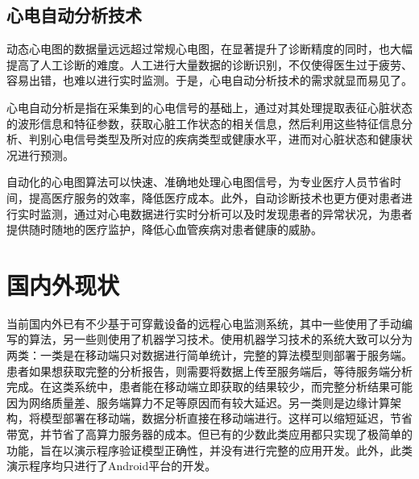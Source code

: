 \subsection{心电自动分析技术}\label{subsec:automatic-analysis}

动态心电图的数据量远远超过常规心电图，在显著提升了诊断精度的同时，也大幅提高了人工诊断的难度。人工进行大量数据的诊断识别，不仅使得医生过于疲劳、容易出错，也难以进行实时监测。于是，心电自动分析技术的需求就显而易见了。

心电自动分析是指在采集到的心电信号的基础上，通过对其处理提取表征心脏状态的波形信息和特征参数，获取心脏工作状态的相关信息，然后利用这些特征信息分析、判别心电信号类型及所对应的疾病类型或健康水平，进而对心脏状态和健康状况进行预测\cite{jiXindianxinhaozidongfenxiguanjianjishuyanjiu2006}。

自动化的心电图算法可以快速、准确地处理心电图信号，为专业医疗人员节省时间，提高医疗服务的效率，降低医疗成本。此外，自动诊断技术也更方便对患者进行实时监测，通过对心电数据进行实时分析可以及时发现患者的异常状况，为患者提供随时随地的医疗监护，降低心血管疾病对患者健康的威胁。


\section{国内外\app 现状}\label{sec:status}


当前国内外已有不少基于可穿戴设备的远程心电监测系统，其中一些使用了手动编写的算法\cite{zhengJiyukechuandaishebeideyidongjianhuAPP2019,wuYidongxindianjiancexitongdeyanjiuyushixian2018,chenYidongxindianxinxijianhuxitongjixindianjiancesuanfadeyanjiu2018,heJiyuyidongpingtaidexindianjianceyiliaoxitongdeshixian2017,gradlRealtimeECGMonitoring2012,wenRealtimeECGTelemonitoring2008}，另一些则使用了机器学习技术。使用机器学习技术的系统大致可以分为两类：一类是在移动端只对数据进行简单统计，完整的算法模型则部署于服务端\cite{wangJiyushenduxuexideyidongyuanchengxindianjiancexitongshejiyushixian2020,singhSmartECGMonitoring2022}。患者如果想获取完整的分析报告，则需要将数据上传至服务端后，等待服务端分析完成。在这类系统中，患者能在移动端立即获取的结果较少，而完整分析结果可能因为网络质量差、服务端算力不足等原因而有较大延迟。另一类则是边缘计算架构，将模型部署在移动端，数据分析直接在移动端进行\cite{chenJiyushenduxuexidexindianfenximoxingdeshejiyuyouhua2021,liuJiyuyidongzhongduanfenxidekechuandairouxingxindianjiancexitong2021,wangEnablingSmartPersonalized2014,jinPredictingCardiovascularDisease2009}。这样可以缩短延迟，节省带宽，并节省了高算力服务器的成本。但已有的少数此类应用都只实现了极简单的功能，旨在以演示程序验证模型正确性，并没有进行完整的应用开发。此外，此类演示程序均只进行了Android平台的开发。


